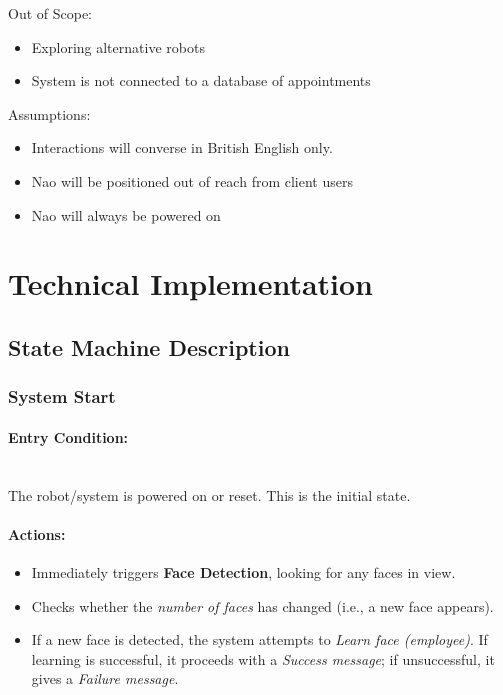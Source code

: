\documentclass[conference]{IEEEtran}
\begin{document}
Out of Scope:
\begin{itemize}
        \item Exploring alternative robots
        \item System is not connected to a database of appointments 
\end{itemize}

Assumptions:
\begin{itemize}
        \item Interactions will converse in British English only.
        \item Nao will be positioned out of reach from client users
        \item Nao will always be powered on
\end{itemize}

\section{Technical Implementation}

\subsection{State Machine Description}

\subsubsection{System Start}
\paragraph{Entry Condition:}
\mbox{}\\
The robot/system is powered on or reset. This is the initial state.

\paragraph{Actions:}
\begin{itemize}
  \item Immediately triggers \textbf{Face Detection}, looking for any faces in view.
  \item Checks whether the \emph{number of faces} has changed (i.e., a new face appears).
  \item If a new face is detected, the system attempts to \emph{Learn face (employee)}. If learning is successful, it proceeds with a \emph{Success message}; if unsuccessful, it gives a \emph{Failure message}.
\end{itemize}
\end{document}

